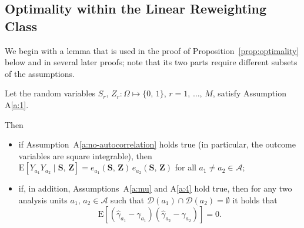 \documentclass[sigconf]{acmart}
\newcounter{assumption}
\newcommand{\E}{\mathrm E}
\begin{document}
\subsection{Optimality within the Linear Reweighting Class}\label{app:optimality}

We begin with a lemma that is used in the proof of Proposition~\ref{prop:optimality} below and in several later proofs; note that its two parts require different subsets of the assumptions.

\begin{lemma}\label{lem:cov=0}
    Let the random variables $S_r,\,Z_r\colon\Omega\mapsto\{0,\,1\}$, $r=1,\,\ldots,\,M$, satisfy Assumption A\ref{a:1}.

    Then
    \begin{itemize}
        \item[\textup{(a)}] if Assumption~A\ref{a:no-autocorrelation} holds true (in particular, the outcome variables are square integrable), then
            $\E[Y_{a_1}Y_{a_2}\mid \mathbf{S},\,\mathbf{Z}] = e_{a_1}(\mathbf{S},\,\mathbf{Z})\,e_{a_2}(\mathbf{S},\,\mathbf{Z})$ for all $a_1\neq a_2\in\mathcal A$;
        \item[\textup{(b)}] if, in addition, Assumptions~A\ref{a:mu} and A\ref{a:4} hold true, then for any two analysis units $a_1,\,a_2\in\mathcal{A}$ such that $\mathcal D(a_1)\cap \mathcal D(a_2) = \emptyset$ it holds that
        \begin{equation}\label{eq:cov=0}
            \E[(\hat\gamma_{a_1} - \gamma_{a_1})(\hat\gamma_{a_2} - \gamma_{a_2})] = 0.
        \end{equation}
    \end{itemize}
\end{lemma}
\end{document}
